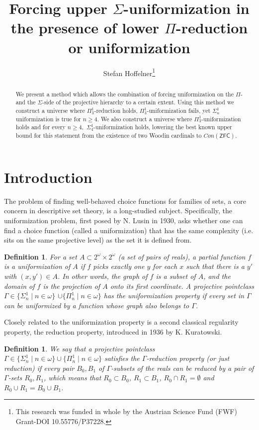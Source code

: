 \documentclass[a4paper,11pt]{article}
\title{Forcing upper $\Sigma$-uniformization in the presence of lower $\Pi$-reduction or uniformization}
\author{ Stefan Hoffelner\footnote{This research was funded in whole by the Austrian Science Fund (FWF) Grant-DOI 10.55776/P37228.}  }
\newtheorem{definition}[theorem]{Definition}
\newcommand{\ZFC}{\mathsf{ZFC}}
\begin{document}
    
    \maketitle
    
    
 \begin{abstract}
 We present a method which allows the combination of forcing uniformization on the $\Pi$- and the $\Sigma$-side of the projective hierarchy to a certain extent. Using this method
we construct a universe where ${\Pi}^1_3$-reduction holds, $\Pi^1_3$-uniformization fails, yet $\Sigma^1_n$ uniformization is true for $n \ge 4$. We also construct a universe where $\Pi^1_3$-uniformization holds and for every $n \ge 4, $ $ \Sigma^1_4$-uniformization holds, lowering the best known upper bound for this statement from the existence of two Woodin cardinals to $Con(\ZFC)$.
\end{abstract}


\section{Introduction}


The problem of finding well-behaved choice functions for families of sets, a core concern in descriptive set theory, is a long-studied subject. Specifically, the uniformization problem, first posed by N. Lusin in 1930, asks whether one can find a choice function (called a uniformization) that has the same complexity (i.e. sits on the same projective level) as the set it is defined from.


\begin{definition}
For a set $A \subset 2^{\omega} \times 2^{\omega}$ (a set of pairs of reals), a partial function $f$ is a uniformization of $A$ if $f$ picks exactly one $y$ for each $x$ such that there is a $y'$ with $(x, y') \in A$. In other words, the graph of $f$ is a subset of $A$, and the domain of $f$ is the projection of $A$ onto its first coordinate. A projective pointclass $\Gamma \in \{ \Sigma^1_n \mid n \in \omega\}$ $ \cup \{\Pi^1_n \mid n \in \omega \}$  has the uniformization property if every set in $\Gamma$ can be uniformized by a function whose graph also belongs to $\Gamma$.
\end{definition}


Closely related to the uniformization property is a second classical regularity property, the reduction property, introduced in 1936 by K. Kuratowski.


\begin{definition}
We say that a projective pointclass $\Gamma \in \{ \Sigma^1_n \mid n \in \omega\} \cup \{\Pi^1_n \mid n \in \omega \}$ satisfies the $\Gamma$-reduction property (or just reduction) if every pair $B_0,B_1$ of $\Gamma$-subsets of the reals can be reduced by a pair of $\Gamma$-sets $R_0,R_1$, which means that $R_0 \subset B_0$, $R_1 \subset B_1$, $R_0 \cap R_1= \emptyset$ and $R_0 \cup R_1=B_0 \cup B_1$.
\end{definition}
\end{document}
